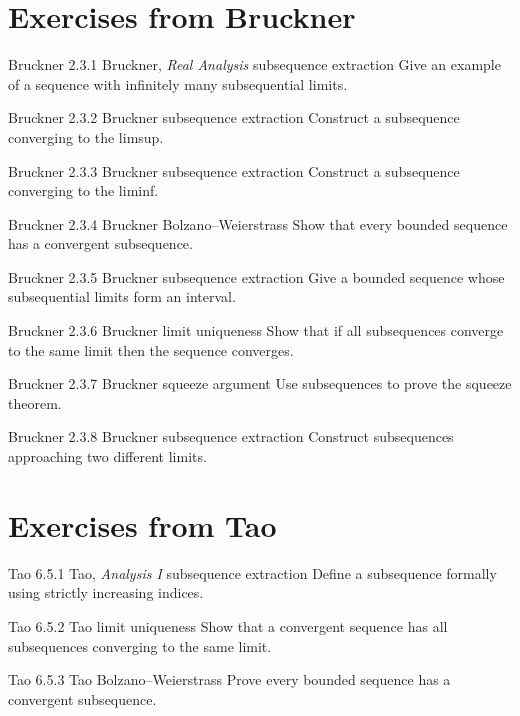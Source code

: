 
\section*{Exercises from Bruckner}

\exstub
{Bruckner 2.3.1}
{Bruckner, \textit{Real Analysis}}
{subsequence extraction}
{Give an example of a sequence with infinitely many
subsequential limits.}

\exstub
{Bruckner 2.3.2}
{Bruckner}
{subsequence extraction}
{Construct a subsequence converging to the limsup.}

\exstub
{Bruckner 2.3.3}
{Bruckner}
{subsequence extraction}
{Construct a subsequence converging to the liminf.}

\exstub
{Bruckner 2.3.4}
{Bruckner}
{Bolzano–Weierstrass}
{Show that every bounded sequence has a convergent subsequence.}

\exstub
{Bruckner 2.3.5}
{Bruckner}
{subsequence extraction}
{Give a bounded sequence whose subsequential limits form
an interval.}

\exstub
{Bruckner 2.3.6}
{Bruckner}
{limit uniqueness}
{Show that if all subsequences converge to the same limit
then the sequence converges.}

\exstub
{Bruckner 2.3.7}
{Bruckner}
{squeeze argument}
{Use subsequences to prove the squeeze theorem.}

\exstub
{Bruckner 2.3.8}
{Bruckner}
{subsequence extraction}
{Construct subsequences approaching two different limits.}


\section*{Exercises from Tao}

\exstub
{Tao 6.5.1}
{Tao, \textit{Analysis I}}
{subsequence extraction}
{Define a subsequence formally using strictly increasing indices.}

\exstub
{Tao 6.5.2}
{Tao}
{limit uniqueness}
{Show that a convergent sequence has all subsequences converging
to the same limit.}

\exstub
{Tao 6.5.3}
{Tao}
{Bolzano–Weierstrass}
{Prove every bounded sequence has a convergent subsequence.}

